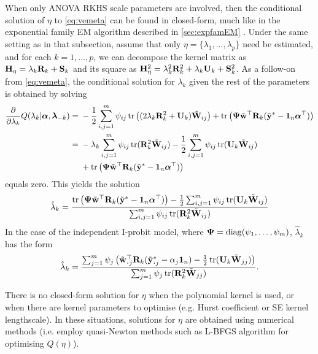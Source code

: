 When only ANOVA RKHS scale parameters are involved, then the conditional solution of $\eta$ to \cref{eq:vemeta} can be found in closed-form, much like in the exponential family EM algorithm described in \cref{sec:expfamEM} .
Under the same setting as in that subsection, assume that only $\eta = \{\lambda_1,\dots,\lambda_p\}$ need be estimated, and for each $k=1,\dots,p$, we can decompose the kernel matrix as ${\mathbf H}_\eta = \lambda_k {\mathbf R}_k + {\mathbf S}_k$ and its square as ${\mathbf H}_\eta^2 = \lambda_k^2 {\mathbf R}_k^2 + \lambda_k {\mathbf U}_k + {\mathbf S}_k^2$.
As a follow-on from \cref{eq:vemeta}, the conditional solution for $\lambda_k$ given the rest of the parameters is obtained by solving
\begin{align*}
  \frac{\partial}{\partial\lambda_k}Q(\lambda_k|{\bm\alpha},{\bm\lambda}_{-k})
  ={}& -\frac{1}{2} \sum_{i,j=1}^m \psi_{ij} \operatorname{tr} \left( (2\lambda_k{\mathbf R}_k^2 + {\mathbf U}_k) \tilde{{\mathbf W}}_{ij} \right) 
  + \operatorname{tr}\left( {\bm\Psi} \tilde{{\mathbf w}}^\top {\mathbf R}_k (\tilde{{\mathbf y}}^* - {\mathbf 1}_n{\bm\alpha}^\top)  \right) \\
  ={}& - \lambda_k \sum_{i,j=1}^m \psi_{ij} \operatorname{tr}({\mathbf R}_k^2\tilde{{\mathbf W}}_{ij})
  - \frac{1}{2} \sum_{i,j=1}^m \psi_{ij} \operatorname{tr}({\mathbf U}_k\tilde{{\mathbf W}}_{ij}) \\
  &+ \operatorname{tr}\left( {\bm\Psi} \tilde{{\mathbf w}}^\top {\mathbf R}_k (\tilde{{\mathbf y}}^* - {\mathbf 1}_n{\bm\alpha}^\top)  \right) 
\end{align*} 
equals zero.
This yields the solution
\[
  \hat\lambda_k 
  = \frac{
  \operatorname{tr}\left( {\bm\Psi} \tilde{{\mathbf w}}^\top {\mathbf R}_k (\tilde{{\mathbf y}}^* - {\mathbf 1}_n{\bm\alpha}^\top) \right)
  - \frac{1}{2} \sum_{i,j=1}^m \psi_{ij} \operatorname{tr}({\mathbf U}_k\tilde{{\mathbf W}}_{ij})
  }{
  \sum_{i,j=1}^m \psi_{ij} \operatorname{tr}({\mathbf R}_k^2\tilde{{\mathbf W}}_{ij})
  }
\]
In the case of the independent I-probit model, where ${\bm\Psi} = \operatorname{diag}(\psi_1,\dots,\psi_m)$, $\hat\lambda_k$ has the form
\[
  \hat\lambda_k
  = \frac{
  \sum_{j=1}^m \psi_j \left( \tilde\bw^\top_{\bigcdot j} \bR_k (\tilde\by^*_{\bigcdot j} - \alpha_j\bone_n) - \half \tr(\bU_k\tilde\bW_{jj})\right)
  }{
  \sum_{j=1}^m \psi_j \tr(\bR_k^2\tilde\bW_{jj})
  }.
\]

\begin{remark}
  There is no closed-form solution for $\eta$ when the polynomial kernel is used, or when there are kernel parameters to optimise (e.g. Hurst coefficient or SE kernel lengthscale).
  In these situations, solutions for $\eta$ are obtained using numerical methods (i.e. employ quasi-Newton methods such as L-BFGS algorithm for optimising $Q(\eta)$).
\end{remark}

